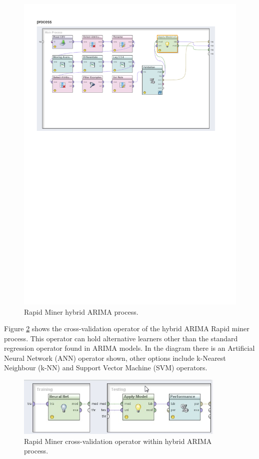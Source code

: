 \begin{figure}[!tbh]
\centering
\includegraphics[width=12cm]{../Figures/chp_ts_rm_arima}
\caption[Rapid Miner hybrid ARIMA process]{Rapid Miner hybrid ARIMA process.}
\label{fig:chp_ts_rm_arima}
\end{figure}

Figure \ref{fig:chp_ts_rm_arima_validation} shows the cross-validation operator of the hybrid ARIMA Rapid miner process. This operator can hold alternative learners other than the standard regression operator found in ARIMA models. In the diagram there is an Artificial Neural Network (ANN) operator shown, other options include k-Nearest Neighbour (k-NN) and Support Vector Machine (SVM) operators.

\begin{figure}[h!]
\centering
\includegraphics[width=10cm]{../Figures/chp_ts_rm_arima_validation}
\caption[Rapid Miner cross-validation operator]{Rapid Miner cross-validation operator within hybrid ARIMA process.}
\label{fig:chp_ts_rm_arima_validation}
\end{figure}

